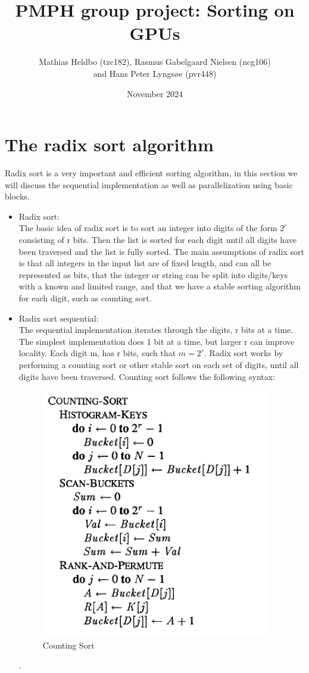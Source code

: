\documentclass{article}
\title{PMPH group project: Sorting on GPUs}
\author{Mathias Heldbo (tzc182), Rasmus Gabelgaard Nielsen (ncg106) \\ and Hans Peter Lyngsøe (pvr448)}
\date{November 2024}
\begin{document}
\maketitle

\section{The radix sort algorithm }
Radix sort is a very important and efficient sorting algorithm, in this section we will discuss the sequential implementation as well as parallelization using basic blocks.
\begin{itemize}
\item Radix sort: \\
The basic idea of radix sort is to sort an integer into digits of the form $2^r$ consisting of r bits. Then the list is sorted for each digit until all digits have been traversed and the list is fully sorted. The main assumptions of radix sort is that all integers in the input list are of fixed length, and can all be represented as bits, that the integer or string can be split into digits/keys with a known and limited range, and that we have a stable sorting algorithm for each digit, such as counting sort. 
\item Radix sort sequential: \\
The sequential implementation iterates through the digits, r bits at a time. The simplest implementation does 1 bit at a time, but larger r can improve locality. Each digit m, has r bits, such that $m = 2^r$. Radix sort works by performing a counting sort or other stable sort on each set of digits, until all digits have been traversed. Counting sort follows the following syntax: 
\begin{figure} [H]
    \includegraphics[width=0.5\linewidth]{images/count_sort.PNG}
    \caption{Counting Sort \citep{zagharadixvector}}
    \label{fig:enter-label}
\end{figure}.


\end{itemize}
\end{document}

